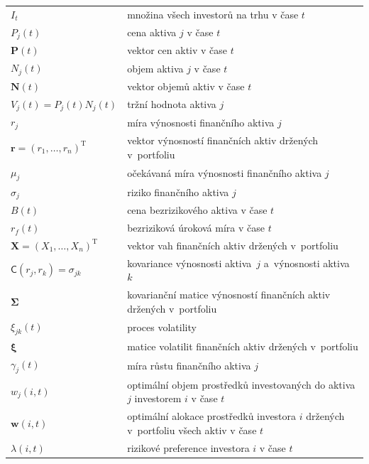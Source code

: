 \documentclass[a4paper,12pt]{report}
\theoremstyle{definition} \newtheorem{definice}[veta]{Definice}
\theoremstyle{remark}
\begin{document}
   \begin{tabular}{p{4cm} p{9.3cm}}
   $I_t$ 								& množina všech investorů na trhu v čase $t$\\
   $P_j(t)$                             &   cena aktiva $j$ v čase $t$ \\
   $\boldsymbol{P}(t)$                             &   vektor cen aktiv v čase $t$\\
   $N_j(t)$                             &   objem aktiva $j$ v čase $t$ \\
   $\boldsymbol{N}(t)$     &   vektor objemů aktiv v čase $t$\\
   $V_j(t)=P_j(t)N_j(t)$       &  tržní hodnota aktiva $j$\\
   $r_j$  								& míra výnosnosti finančního aktiva $j$\\
   $\boldsymbol{r}=(r_1,\dots,r_n)^\mathrm{T}$  		& vektor výnosností finančních aktiv držených v~portfoliu\\
   $\mu_j$ 								& očekávaná míra výnosnosti finančního aktiva $j$\\
   $\sigma_j$								& riziko finančního aktiva $j$\\
   $B(t)$ 								& cena bezrizikového aktiva v čase $t$\\
   $r_f(t)$ 								& bezriziková úroková míra v čase $t$\\
   $\boldsymbol{X}=(X_1,\dots,X_n)^\mathrm{T}$		& vektor vah finančních aktiv držených v~portfoliu\\
   $\mathsf{C}(r_j,r_k)=\sigma_{jk}$				& kovariance výnosnosti aktiva~$j$ a~výnosnosti aktiva~$k$\\
   $\boldsymbol{\Sigma}$						& kovarianční matice výnosností finančních aktiv držených v~portfoliu\\
   $\xi_{jk}(t)$ 							& proces volatility\\
   $\boldsymbol{\xi}$						& matice volatilit finančních aktiv držených v~portfoliu\\
   $\gamma_j(t)$ 							& míra růstu  finančního aktiva $j$\\
   $w_{j}(i,t)$ 							& optimální objem prostředků investovaných do aktiva $j$ investorem $i$ v čase $t$\\
   $\boldsymbol{w}(i,t)$					 	& optimální alokace prostředků investora $i$ držených v~portfoliu všech aktiv v čase $t$\\
   $\lambda(i,t)$							& rizikové preference investora $i$ v čase $t$ \\  
\end{tabular}\\\\\\
\end{document}
